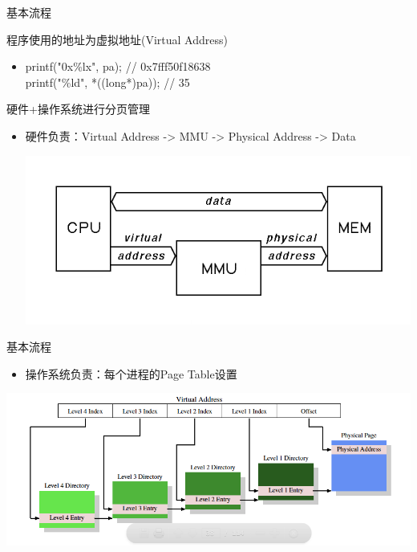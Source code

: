 \documentclass[handout]{beamer}
\begin{document}
\begin{CJK}{UTF8}{gbsn}
\begin{frame}{基本流程}
  \begin{block}{程序使用的地址为虚拟地址(Virtual Address)}
    \begin{itemize}
      \item {
          printf("0x\%lx", pa); // 0x7fff50f18638 \\
          printf("\%ld", *((long*)pa)); // 35
      }
    \end{itemize}
  \end{block}
  \begin{block}{硬件+操作系统进行分页管理}
    \begin{itemize}
      \item {
          硬件负责：Virtual Address -> MMU -> Physical Address -> Data
          \begin{center}
            \includegraphics[scale=0.3]{./images/cpu-mmu}
          \end{center}
      }
    \end{itemize}
  \end{block}
\end{frame}

\begin{frame}{基本流程}
  \begin{block}{}
    \begin{itemize}
      \item {
          操作系统负责：每个进程的Page Table设置
      }
    \end{itemize}
    \begin{center}
      \includegraphics[scale=0.22]{./images/page-table}
    \end{center}
  \end{block}
\end{frame}


\end{CJK}
\end{document}
